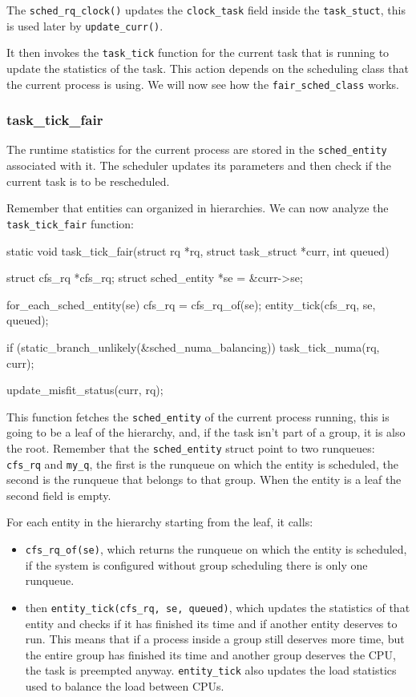 The \verb|sched_rq_clock()| updates the \verb|clock_task| field inside the \verb|task_stuct|, this is used later by \verb|update_curr()|.

It then invokes the \verb|task_tick| function for the current task that is running to update the statistics of the task. This action depends on the scheduling class that the current process is using. We will now see how the \verb|fair_sched_class| works.

\subsubsection{task\_tick\_fair}

The runtime statistics for the current process are stored in the \verb|sched_entity| associated with it. The scheduler updates its parameters and then check if the current task is to be rescheduled. 

Remember that entities can organized in hierarchies.
We can now analyze the \verb|task_tick_fair| function:
\begin{code}
static void task_tick_fair(struct rq *rq, struct task_struct *curr, int queued)
{
	struct cfs_rq *cfs_rq;
	struct sched_entity *se = &curr->se;

	for_each_sched_entity(se) {
		cfs_rq = cfs_rq_of(se);
		entity_tick(cfs_rq, se, queued);
	}

	if (static_branch_unlikely(&sched_numa_balancing))
		task_tick_numa(rq, curr);

	update_misfit_status(curr, rq);
}
\end{code}

This function fetches the \verb|sched_entity| of the current process running, this is going to be a leaf of the hierarchy, and, if the task isn't part of a group, it is also the root. Remember that the \verb|sched_entity| struct point to two runqueues: \verb|cfs_rq| and \verb|my_q|, the first is the runqueue on which the entity is scheduled, the second is the runqueue that belongs to that group. When the entity is a leaf the second field is empty. 

For each entity in the hierarchy starting from the leaf, it calls:
\begin{itemize}
    \item \verb|cfs_rq_of(se)|, which returns the runqueue on which the entity is scheduled, if the system is configured without group scheduling there is only one runqueue.
    
    \item then \verb|entity_tick(cfs_rq, se, queued)|, which updates the statistics of that entity and checks if it has finished its time and if another entity deserves to run. This means that if a process inside a group still deserves more time, but the entire group has finished its time and another group deserves the CPU, the task is preempted anyway. \verb|entity_tick| also updates the load statistics used to balance the load between CPUs.
\end{itemize}


